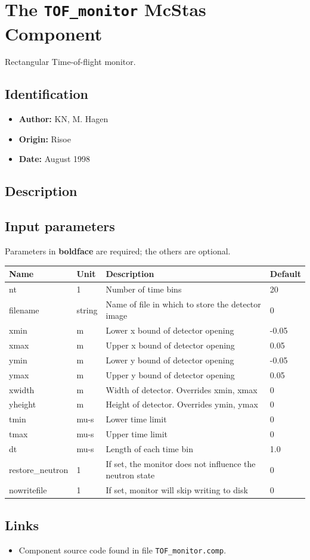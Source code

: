 \section{The \texttt{TOF\_monitor} McStas Component}
Rectangular Time-of-flight monitor.

\subsection*{Identification}
\begin{itemize}
  \item \textbf{Author:} KN, M. Hagen
  \item \textbf{Origin:} Risoe
  \item \textbf{Date:} August 1998
\end{itemize}

\subsection*{Description}


\subsection*{Input parameters}
Parameters in \textbf{boldface} are required; the others are optional.

\begin{longtable}{p{}p{}p{}p{}}
\toprule
\textbf{Name} & \textbf{Unit} & \textbf{Description} & \textbf{Default} \\
\midrule
\endhead
nt & 1 & Number of time bins & 20 \\
filename & string & Name of file in which to store the detector image & 0 \\
xmin & m & Lower x bound of detector opening & -0.05 \\
xmax & m & Upper x bound of detector opening & 0.05 \\
ymin & m & Lower y bound of detector opening & -0.05 \\
ymax & m & Upper y bound of detector opening & 0.05 \\
xwidth & m & Width of detector. Overrides xmin, xmax & 0 \\
yheight & m & Height of detector. Overrides ymin, ymax & 0 \\
tmin & mu-s & Lower time limit & 0 \\
tmax & mu-s & Upper time limit & 0 \\
dt & mu-s & Length of each time bin & 1.0 \\
restore\_neutron & 1 & If set, the monitor does not influence the neutron state & 0 \\
nowritefile & 1 & If set, monitor will skip writing to disk & 0 \\
\bottomrule
\end{longtable}

\subsection*{Links}
\begin{itemize}
  \item Component source code found in file \texttt{TOF\_monitor.comp}.
\end{itemize}
